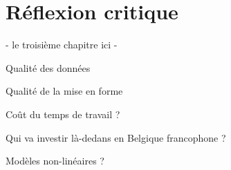 
\chapter{Réflexion critique}

- le troisième chapitre ici -

Qualité des données

Qualité de la mise en forme

Coût du temps de travail ?

Qui va investir là-dedans en Belgique francophone ?

Modèles non-linéaires ?
